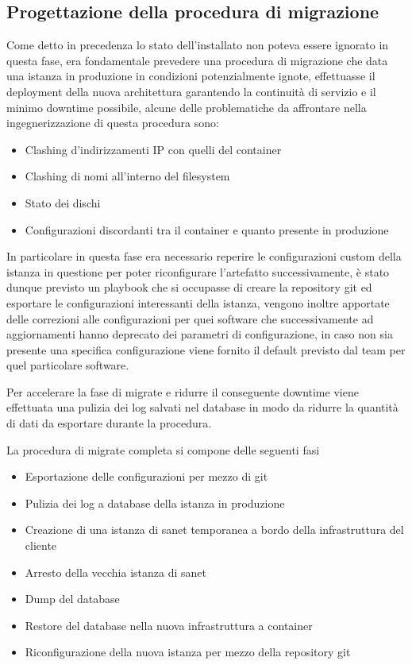 \subsection{Progettazione della procedura di migrazione}
Come detto in precedenza lo stato dell'installato non poteva essere ignorato in questa fase, era fondamentale prevedere una procedura di migrazione che data una istanza in produzione in condizioni potenzialmente ignote, effettuasse il deployment della nuova architettura garantendo la continuità di servizio e il minimo downtime possibile, alcune delle problematiche da affrontare nella ingegnerizzazione di questa procedura sono:

\begin{itemize}
  \item{Clashing d'indirizzamenti IP con quelli del container}
  \item{Clashing di nomi all'interno del filesystem}
  \item{Stato dei dischi}
  \item{Configurazioni discordanti tra il container e quanto presente in produzione}
\end{itemize}

In particolare in questa fase era necessario reperire le configurazioni custom della istanza in questione per poter riconfigurare l'artefatto successivamente, è stato dunque previsto un playbook che si occupasse di creare la repository git ed esportare le configurazioni interessanti della istanza, vengono inoltre apportate delle correzioni alle configurazioni per quei software che successivamente ad aggiornamenti hanno deprecato dei parametri di configurazione, in caso non sia presente una specifica configurazione viene fornito il default previsto dal team per quel particolare software.

Per accelerare la fase di migrate e ridurre il conseguente downtime viene effettuata una pulizia dei log salvati nel database in modo da ridurre la quantità di dati da esportare durante la procedura.

La procedura di migrate completa si compone delle seguenti fasi

\begin{itemize}
  \item{Esportazione delle configurazioni per mezzo di git}
  \item{Pulizia dei log a database della istanza in produzione}
  \item{Creazione di una istanza di sanet temporanea a bordo della infrastruttura del cliente}
  \item{Arresto della vecchia istanza di sanet}
  \item{Dump del database}
  \item{Restore del database nella nuova infrastruttura a container}
  \item{Riconfigurazione della nuova istanza per mezzo della repository git}
\end{itemize}

